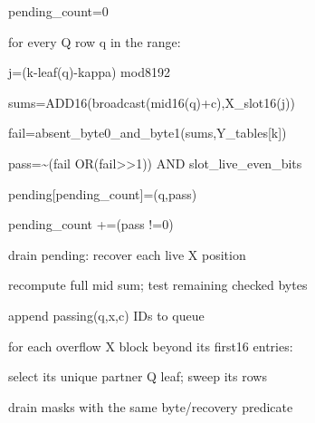 \documentclass[10pt,letterpaper]{article}
\begin{document}
{\noindent\hspace*{16em}pending\_count=0\par

\noindent\hspace*{16em}for every Q row q in the range:\par

\noindent\hspace*{20em}j=(k-leaf(q)-kappa) mod8192\par

\noindent\hspace*{20em}sums=ADD16(broadcast(mid16(q)+c),X\_slot16(j))\par

\noindent\hspace*{20em}fail=absent\_byte0\_and\_byte1(sums,Y\_tables[k])\par

\noindent\hspace*{20em}pass=\textasciitilde{}(fail OR(fail>>1)) AND slot\_live\_even\_bits\par

\noindent\hspace*{20em}pending[pending\_count]=(q,pass)\par

\noindent\hspace*{20em}pending\_count +=(pass !=0)\par

\noindent\hspace*{16em}drain pending: recover each live X position\par

\noindent\hspace*{16em}recompute full mid sum; test remaining checked bytes\par

\noindent\hspace*{16em}append passing(q,x,c) IDs to queue\par

\noindent\hspace*{12em}for each overflow X block beyond its first16 entries:\par

\noindent\hspace*{16em}select its unique partner Q leaf; sweep its rows\par

\noindent\hspace*{16em}drain masks with the same byte/recovery predicate\par

}
\end{document}
